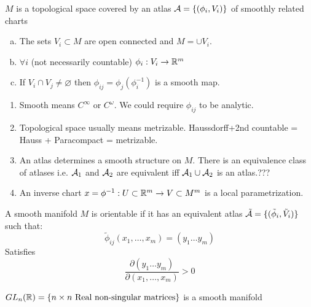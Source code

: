 \begin{ddef}
$M$ is a topological space covered by an atlas $\mathcal{A}=\{(\phi_i, V_i)\}$ of smoothly related charts
\begin{enumerate}[a)]
\item  The sets $V_i\subset M$ are open connected and $M=\cup V_i$.
\item $\forall i$ (not necessarily countable) $\phi_i:V_i\to \mathbb{R}^m$
\item If $V_i\cap V_j \neq \varnothing$ then $\phi_{ij} = \phi_j(\phi_i^{-1})$ is a smooth map.   
\end{enumerate}
\end{ddef}

\begin{remarks}
\begin{enumerate}
\item Smooth means $C^\infty$ or $C^\omega$. We could require $\phi_{ij}$ to be analytic.
\item Topological space usually means metrizable. Haussdorff+2nd countable = Hauss + Paracompact = metrizable.
\item An atlas determines a smooth structure on $M$. There is an equivalence class of atlases i.e. $\mathcal{A}_1$ and $\mathcal{A}_2$ are equivalent iff $\mathcal{A}_1\cup \mathcal{A}_2$ is an atlas.???
\item An inverse chart $x=\phi^{-1}:U\subset \mathbb{R}^m \to V\subset M^m$ is a local parametrization.
\end{enumerate}
\end{remarks}

\begin{ddef}[Orientability]
A smooth manifold $M$ is orientable if it has an equivalent atlas $\tilde{\mathcal{A}}=\{(\tilde{\phi}_i, \tilde{V}_i)\}$ such that: 
    $$\tilde{\phi}_{ij}(x_1,\ldots,x_m)= (y_1\ldots y_m)$$
    Satisfies
    $$\frac{\partial(y_1\ldots y_m)}{\partial(x_1,\ldots,x_m)}>0$$
\end{ddef}

\begin{examples}
$GL_n(\mathbb{R}) = \{n\times n \text{ Real non-singular matrices}\}$ is a smooth manifold
\end{examples}
